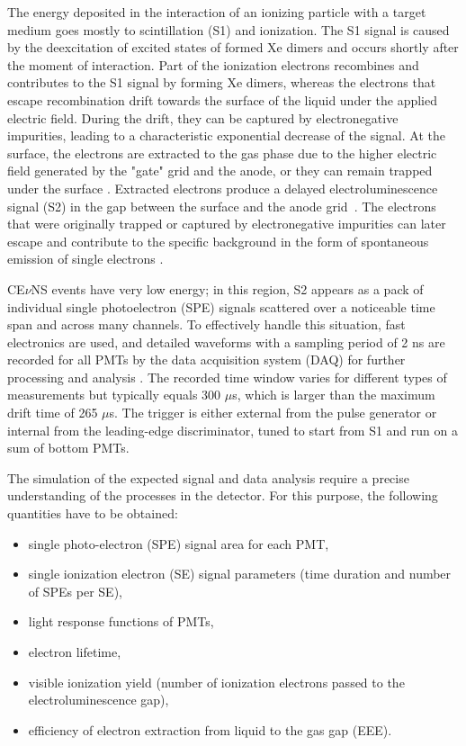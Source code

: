 \documentclass[a4paper,11pt]{article}
\newcommand{\cevns}{CE$\nu$NS}
\begin{document}
The energy deposited in the interaction of an ionizing particle with a target medium goes mostly to scintillation (S1) and ionization. The S1 signal is caused by the deexcitation of excited states of formed Xe dimers and occurs shortly after the moment of interaction. Part of the ionization electrons recombines and contributes to the S1 signal by forming Xe dimers, whereas the electrons that escape recombination drift towards the surface of the liquid under the applied electric field.
During the drift, they can be captured by electronegative impurities, leading to a characteristic exponential decrease of the signal. At the surface, the electrons are extracted to the gas phase due to the higher electric field generated by the "gate" grid and the anode, or they can remain trapped under the surface \cite{Akimov:2012zz}. Extracted electrons produce a delayed electroluminescence signal (S2) in the gap between the surface and the anode grid~\cite{Aprile:2008bga}. The electrons that were originally trapped or captured by electronegative impurities can later escape and contribute to the specific background in the form of spontaneous emission of single electrons \cite{Akimov_2016_delayed_electrons, PhysRevD.102.092004, Kopec_2021}.

\cevns{} events have very low energy; in this region, S2 appears as a pack of individual single photoelectron (SPE) signals scattered over a noticeable time span and across many channels. 
%
To effectively handle this situation, fast electronics are used, and detailed waveforms with a sampling period of 2 ns are recorded for all PMTs by the data acquisition system (DAQ) for further processing and analysis \cite{Akimov2017}. The recorded time window varies for different types of measurements but typically equals 300 $\mu$s, which is larger than the maximum drift time of 265 $\mu$s. The trigger is either external from the pulse generator or internal from the leading-edge discriminator, tuned to start from S1 and run on a sum of bottom PMTs.

The simulation of the expected signal and data analysis require a precise understanding of the processes in the detector. For this purpose, the following quantities have to be obtained:

\begin{itemize}
    \item single photo-electron (SPE) signal area for each PMT,
    \item single ionization electron (SE) signal parameters (time duration and number of SPEs per SE),
    \item light response functions of PMTs,
    \item electron lifetime,
    \item visible ionization yield (number of ionization electrons passed to the electroluminescence gap),
    \item efficiency of electron extraction from liquid to the gas gap (EEE).
\end{itemize} 
\end{document}
